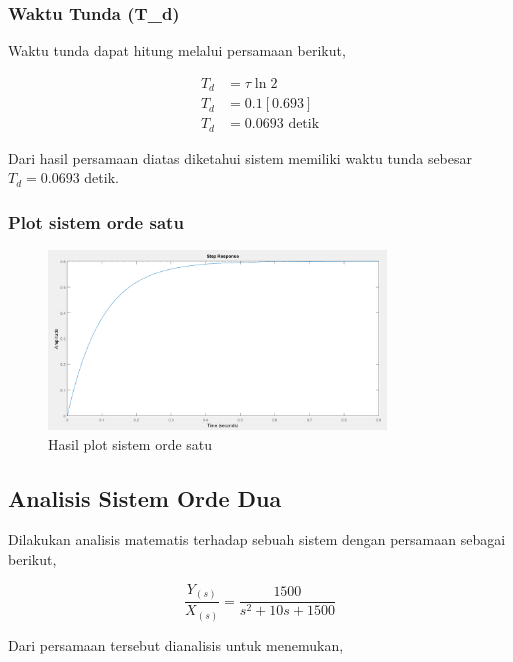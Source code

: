 \documentclass[../laporan]{subfiles}
\begin{document}
\subsubsection{Waktu Tunda (T_d)}

Waktu tunda dapat hitung melalui persamaan berikut,

\begin{equation}
    \begin{split}
        T_d &= \tau\ln{2} \\[5pt]
        T_d &= 0.1[0.693] \\[5pt]
        T_d &= 0.0693 \text{ detik}
    \end{split}
\end{equation}

Dari hasil persamaan diatas diketahui sistem memiliki waktu tunda sebesar $T_d = 0.0693$ detik.

\subsubsection{Plot sistem orde satu}

\begin{figure}[H]
    \centering
    \includegraphics[width = 0.8\textwidth]{figure/plot_orde_satu.png}
    \caption{Hasil plot sistem orde satu}
\end{figure}

\subsection{Analisis Sistem Orde Dua}

Dilakukan analisis matematis terhadap sebuah sistem dengan persamaan sebagai berikut,

\begin{equation*}
    \frac{Y_{(s)}}{X_{(s)}} = \frac{1500}{s^2+10s+1500}
\end{equation*}

Dari persamaan tersebut dianalisis untuk menemukan,
\end{document}
